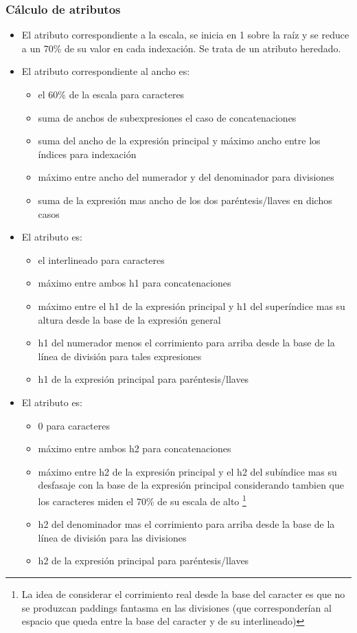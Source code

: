 \subsubsection{Cálculo de atributos}

\begin{itemize}
	\item El atributo \textbf{} correspondiente a la escala, se inicia en 1 sobre la raíz y se reduce a un 70\% de su valor en cada indexación. Se trata de un atributo heredado.

	\item El atributo \textbf{} correspondiente al ancho es:
	\begin{itemize}
		\item el 60\% de la escala para caracteres
		\item suma de anchos de subexpresiones el caso de concatenaciones
		\item suma del ancho de la expresión principal y máximo ancho entre los índices para indexación
		\item máximo entre ancho del numerador y del denominador para divisiones
		\item suma de la expresión mas ancho de los dos paréntesis/llaves en dichos casos
	\end{itemize}

	\item El atributo \textbf{} es:
	\begin{itemize}
		\item el interlineado para caracteres
		\item máximo entre ambos h1 para concatenaciones
		\item máximo entre el h1 de la expresión principal y h1 del superíndice mas su altura desde la base de la expresión general
		\item h1 del numerador menos el corrimiento para arriba desde la base de la línea de división para tales expresiones
		\item h1 de la expresión principal para paréntesis/llaves
	\end{itemize}

	\item El atributo \textbf{} es:
	\begin{itemize}
		\item 0 para caracteres
		\item máximo entre ambos h2 para concatenaciones
		\item máximo entre h2 de la expresión principal y el h2 del subíndice mas su desfasaje con la base de la expresión principal considerando tambien que los caracteres miden el 70\% de su escala de alto \footnote{La idea de considerar el corrimiento real desde la base del caracter es que no se produzcan paddings fantasma en las divisiones (que corresponderían al espacio que queda entre la base del caracter y de su interlineado)}
		\item h2 del denominador mas el corrimiento para arriba desde la base de la línea de división para las divisiones
		\item h2 de la expresión principal para paréntesis/llaves
	\end{itemize}


\end{itemize}
